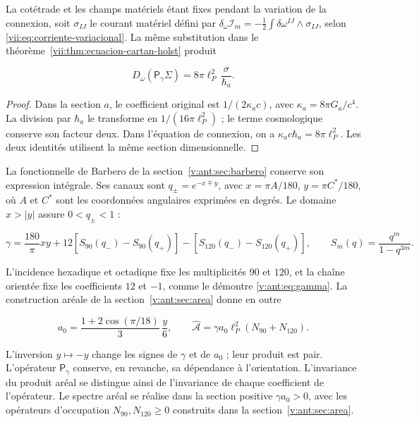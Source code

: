 La cotétrade et les champs matériels étant fixes pendant la variation de la connexion, soit \(\sigma_{IJ}\) le courant matériel défini par
\(\delta_\omega\mathcal I_m=-\tfrac12\int\delta\omega^{IJ}\wedge\sigma_{IJ}\), selon \eqref{vii:eq:corriente-variacional}. La même substitution dans le théorème~\ref{vii:thm:ecuacion-cartan-holst} produit



\begin{equation}
D_\omega(\mathsf P_\gamma\Sigma)
=8\pi\ell_P^2\,\frac{\sigma}{\hbar_a}.
\label{nuc12:eq:4.3}
\end{equation}



\begin{proof}
Dans la section \(a\), le coefficient original est \(1/(2\kappa_a c)\), avec \(\kappa_a=8\pi G_a/c^4\). La division par \(\hbar_a\) le transforme en \(1/(16\pi\ell_P^2)\) ; le terme cosmologique conserve son facteur deux. Dans l’équation de connexion, on a \(\kappa_a c\hbar_a=8\pi\ell_P^2\). Les deux identités utilisent la même section dimensionnelle.
\end{proof}

La fonctionnelle de Barbero de la section~\ref{v:ant:sec:barbero} conserve son expression intégrale. Ses canaux sont \(q_\pm=e^{-x\mp y}\), avec \(x=\pi A/180\), \(y=\pi C^*/180\), où \(A\) et \(C^*\) sont les coordonnées angulaires exprimées en degrés. Le domaine \(x>|y|\) assure \(0<q_\pm<1\) :



\begin{equation}
\gamma=\frac{180}{\pi}xy+
12[S_{90}(q_-)-S_{90}(q_+)]
-[S_{120}(q_-)-S_{120}(q_+)],\qquad
S_m(q)=\frac{q^m}{1-q^{3m}}.
\label{nuc12:eq:4.4}
\end{equation}



L’incidence hexadique et octadique fixe les multiplicités \(90\) et \(120\), et la chaîne orientée fixe les coefficients \(12\) et \(-1\), comme le démontre \eqref{v:ant:eq:gamma}. La construction aréale de la section~\ref{v:ant:sec:area} donne en outre



\begin{equation}
a_0=\frac{1+2\cos(\pi/18)}3\,\frac y6,\qquad
\widehat{\mathcal A}=\gamma a_0\ell_P^2(N_{90}+N_{120}).
\label{nuc12:eq:4.5}
\end{equation}



L’inversion \(y\mapsto-y\) change les signes de \(\gamma\) et de \(a_0\) ; leur produit est pair. L’opérateur \(\mathsf P_\gamma\) conserve, en revanche, sa dépendance à l’orientation. L’invariance du produit aréal se distingue ainsi de l’invariance de chaque coefficient de l’opérateur. Le spectre aréal se réalise dans la section positive \(\gamma a_0>0\), avec les opérateurs d’occupation \(N_{90},N_{120}\geq0\) construits dans la section~\ref{v:ant:sec:area}.


